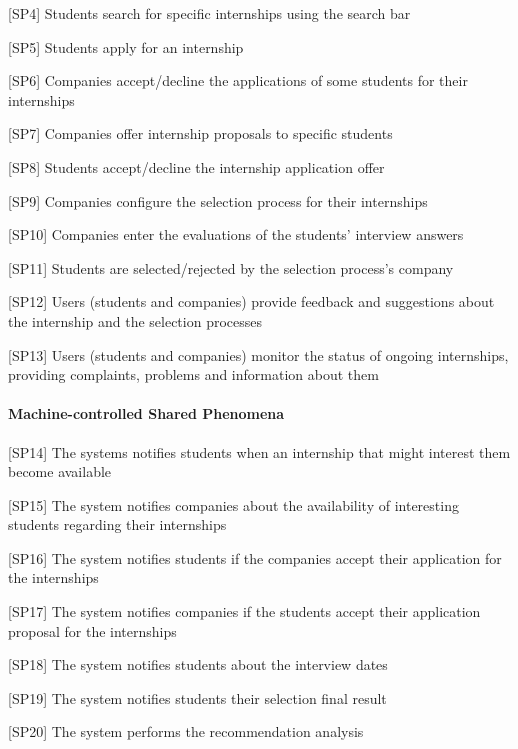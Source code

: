 					[SP4] Students search for specific internships using the search bar
					
					[SP5] Students apply for an internship
					
					[SP6] Companies accept/decline the applications of some students for their internships
					
					[SP7] Companies offer internship proposals to specific students
					
					[SP8] Students accept/decline the internship application offer
					
					[SP9] Companies configure the selection process for their internships
					
					[SP10] Companies enter the evaluations of the students' interview answers
					
					[SP11] Students are selected/rejected by the selection process's company 
					
					[SP12] Users (students and companies) provide feedback and suggestions about the internship and the selection processes
					
					[SP13] Users (students and companies) monitor the status of ongoing internships, providing complaints, problems and information about them
				\paragraph{Machine-controlled Shared Phenomena}
				
				
					[SP14] The systems notifies students when an internship that might interest them become available
					
					[SP15] The system notifies companies about the availability of interesting students regarding their internships
					
					[SP16] The system notifies students if the companies accept their application for the internships
					
					[SP17] The system notifies companies if the students accept their application proposal for the internships
					
					[SP18] The system notifies students about the interview dates
					
					[SP19] The system notifies students their selection final result
					
					[SP20] The system performs the recommendation analysis 
					
